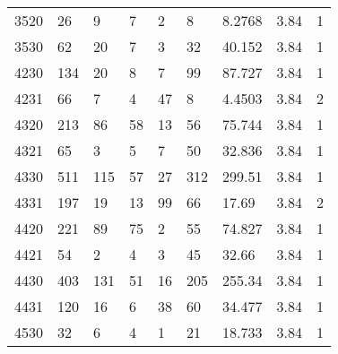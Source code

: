 \begin{longtable}{lllllllll}
3520 & 26            & 9                & 7                  & 2                & 8                  & \cellcolor[HTML]{9AFF99}8.2768 & 3.84 & \cellcolor[HTML]{FFCC67}1 \\
3530 & 62            & 20               & 7                  & 3                & 32                 & \cellcolor[HTML]{9AFF99}40.152 & 3.84 & \cellcolor[HTML]{FFCC67}1 \\
4230 & 134           & 20               & 8                  & 7                & 99                 & \cellcolor[HTML]{9AFF99}87.727 & 3.84 & \cellcolor[HTML]{FFCC67}1 \\
4231 & 66            & 7                & 4                  & 47               & 8                  & \cellcolor[HTML]{9AFF99}4.4503 & 3.84 & \cellcolor[HTML]{96FFFB}2 \\
4320 & 213           & 86               & 58                 & 13               & 56                 & \cellcolor[HTML]{9AFF99}75.744 & 3.84 & \cellcolor[HTML]{FFCC67}1 \\
4321 & 65            & 3                & 5                  & 7                & 50                 & \cellcolor[HTML]{9AFF99}32.836 & 3.84 & \cellcolor[HTML]{FFCC67}1 \\
4330 & 511           & 115              & 57                 & 27               & 312                & \cellcolor[HTML]{9AFF99}299.51 & 3.84 & \cellcolor[HTML]{FFCC67}1 \\
4331 & 197           & 19               & 13                 & 99               & 66                 & \cellcolor[HTML]{9AFF99}17.69  & 3.84 & \cellcolor[HTML]{96FFFB}2 \\
4420 & 221           & 89               & 75                 & 2                & 55                 & \cellcolor[HTML]{9AFF99}74.827 & 3.84 & \cellcolor[HTML]{FFCC67}1 \\
4421 & 54            & 2                & 4                  & 3                & 45                 & \cellcolor[HTML]{9AFF99}32.66  & 3.84 & \cellcolor[HTML]{FFCC67}1\\
4430 & 403           & 131              & 51                 & 16               & 205                & \cellcolor[HTML]{9AFF99}255.34 & 3.84 & \cellcolor[HTML]{FFCC67}1 \\
4431 & 120           & 16               & 6                  & 38               & 60                 & \cellcolor[HTML]{9AFF99}34.477 & 3.84 & \cellcolor[HTML]{FFCC67}1 \\
4530 & 32            & 6                & 4                  & 1                & 21                 & \cellcolor[HTML]{9AFF99}18.733 & 3.84 & \cellcolor[HTML]{FFCC67}1 \\

\end{longtable}
